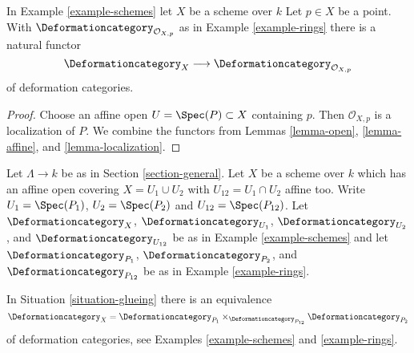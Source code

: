 \begin{lemma}
\label{lemma-local-ring}
In Example \ref{example-schemes} let $X$ be a scheme over $k$
Let $p \in X$ be a point. With $\Deformationcategory_{\mathcal{O}_{X, p}}$
as in Example \ref{example-rings} there is a natural functor
$$
\Deformationcategory_X
\longrightarrow
\Deformationcategory_{\mathcal{O}_{X, p}}
$$
of deformation categories.
\end{lemma}

\begin{proof}
Choose an affine open $U = \Spec(P) \subset X$ containing $p$.
Then $\mathcal{O}_{X, p}$ is a localization of $P$. We combine
the functors from
Lemmas \ref{lemma-open}, \ref{lemma-affine}, and \ref{lemma-localization}.
\end{proof}

\begin{situation}
\label{situation-glueing}
Let $\Lambda \to k$ be as in Section \ref{section-general}.
Let $X$ be a scheme over $k$ which has an affine open covering
$X = U_1 \cup U_2$ with $U_{12} = U_1 \cap U_2$ affine too.
Write $U_1 = \Spec(P_1)$, $U_2 = \Spec(P_2)$ and $U_{12} = \Spec(P_{12})$.
Let $\Deformationcategory_X$, $\Deformationcategory_{U_1}$,
$\Deformationcategory_{U_2}$, and $\Deformationcategory_{U_{12}}$
be as in Example \ref{example-schemes} and let
$\Deformationcategory_{P_1}$, $\Deformationcategory_{P_2}$, and
$\Deformationcategory_{P_{12}}$ be as in Example \ref{example-rings}.
\end{situation}

\begin{lemma}
\label{lemma-glueing}
In Situation \ref{situation-glueing}
there is an equivalence
$$
\Deformationcategory_X =
\Deformationcategory_{P_1}
\times_{\Deformationcategory_{P_{12}}}
\Deformationcategory_{P_2}
$$
of deformation categories, see Examples \ref{example-schemes} and
\ref{example-rings}.
\end{lemma}

